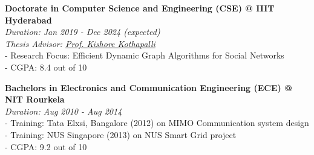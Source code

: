 \textbf{Doctorate in Computer Science and Engineering (CSE) @ IIIT Hyderabad} \\
\emph{Duration: Jan 2019 - Dec 2024 (expected)} \\
\emph{Thesis Advisor: \href{https://faculty.iiit.ac.in/~kkishore/}{Prof. Kishore Kothapalli}} \\
- Research Focus: Efficient Dynamic Graph Algorithms for Social Networks \\
- CGPA: 8.4 out of 10

\noindent
\textbf{Bachelors in Electronics and Communication Engineering (ECE) @ NIT Rourkela} \\
\emph{Duration: Aug 2010 - Aug 2014} \\
- Training: Tata Elxsi, Bangalore (2012) on MIMO Communication system design \\
- Training: NUS Singapore (2013) on NUS Smart Grid project \\
- CGPA: 9.2 out of 10
